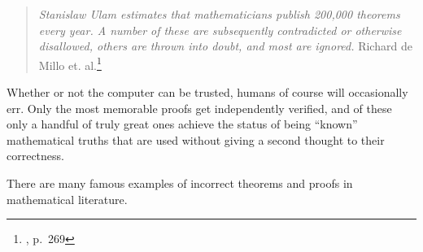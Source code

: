 \begin{quote}
  {\em Stanislaw Ulam estimates that mathematicians publish 200,000 theorems
  every year.  A number of these are subsequently contradicted or otherwise
  disallowed, others are thrown into doubt, and most are ignored.}
  \flushright\sc Richard de Millo et. al.\footnote{\cite{deMillo}, p.~269}\\
\end{quote}

Whether or not the computer can be trusted, humans  of course will occasionally
err. Only the most memorable proofs get independently verified, and of these
only a handful of truly great ones achieve the status of being ``known''
mathematical truths that are used without giving a second thought to their
correctness.

There are many famous examples of incorrect theorems and proofs in
mathematical literature.

